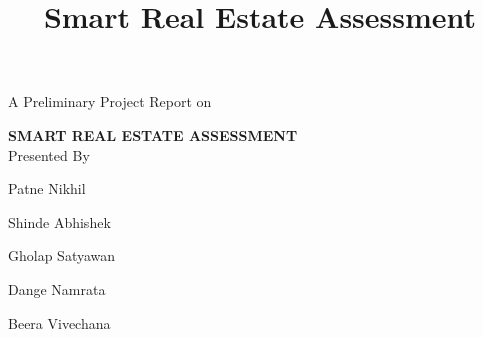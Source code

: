 \documentclass[11pt,fleqn]{book} %
\begin{document}
\title{Smart Real Estate Assessment}


\begingroup
\thispagestyle{empty}
\centering
\vspace*{1cm}
\par\normalfont\fontsize{40}{35}\sffamily\selectfont\color{white}
{\LARGE A Preliminary Project Report on}\par 
\vspace*{4cm}
\textbf{SMART REAL ESTATE ASSESSMENT}\\ %
\vspace*{4cm}
{\large Presented By}\par
\vspace*{1cm}
{\Huge Patne Nikhil}\par
{\Huge Shinde Abhishek}\par
{\Huge Gholap Satyawan}\par
{\Huge Dange Namrata}\par
{\Huge Beera Vivechana}\par
\endgroup

\end{document}
